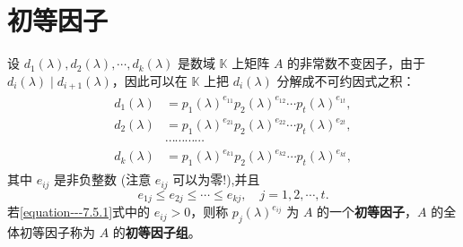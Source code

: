 \documentclass[../../main.tex]{subfiles}%
\begin{document}
\section{初等因子}

\begin{definition}[初等因子]
设 $d_1(\lambda),d_2(\lambda),\cdots,d_k(\lambda)$ 是数域 $\mathbb{K}$ 上矩阵 $A$ 的非常数不变因子，由于 $d_i(\lambda)\mid d_{i + 1}(\lambda)$，因此可以在 $\mathbb{K}$ 上把 $d_i(\lambda)$ 分解成不可约因式之积：
\begin{gather}\label{equation---7.5.1}
\begin{aligned}
d_1(\lambda)&=p_1(\lambda)^{e_{11}}p_2(\lambda)^{e_{12}}\cdots p_t(\lambda)^{e_{1t}},\\
d_2(\lambda)&=p_1(\lambda)^{e_{21}}p_2(\lambda)^{e_{22}}\cdots p_t(\lambda)^{e_{2t}},\\
&\cdots\cdots\cdots\cdots\\
d_k(\lambda)&=p_1(\lambda)^{e_{k1}}p_2(\lambda)^{e_{k2}}\cdots p_t(\lambda)^{e_{kt}},
\end{aligned}
\end{gather}
其中 $e_{ij}$ 是非负整数 (注意 $e_{ij}$ 可以为零!),并且
\[
e_{1j}\leqslant  e_{2j}\leqslant \cdots\leqslant  e_{kj},\quad j = 1, 2, \cdots, t.
\]
若\eqref{equation---7.5.1}式中的 $e_{ij}>0$，则称 $p_j(\lambda)^{e_{ij}}$ 为 $A$ 的一个\textbf{初等因子}，$A$ 的全体初等因子称为 $A$ 的\textbf{初等因子组}。 
\end{definition}
\end{document}
